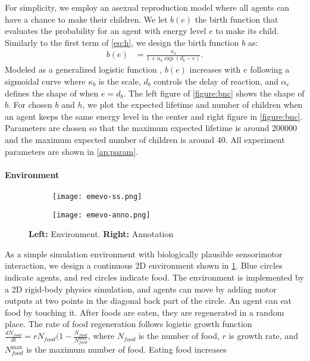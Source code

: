 For simplicity, we employ an asexual reproduction model where all agents can have a chance to make their children. We let $b(e)$ the birth function that evaluates the probability for an agent with energy level $e$ to make its child. Similarly to the first term of \cref{eq:h}, we design the birth function $b$ as:
\begin{align}
 b(e) &=  \frac{\kappa_{b}}{1 + \alpha_{b}\exp(d_{b} - e)}. \label{eq:b}
\end{align}
Modeled as a generalized logistic function \citep{richardsFlexibleGrowthFunction1959}, $b(e)$ increases with $e$ following a sigmoidal curve where $\kappa_{b}$ is the scale, $d_{b}$ controls the delay of reaction, and $\alpha_{e}$ defines the shape of when $e=d_{b}$. The left figure of \cref{figure:bnc} shows the shape of $b$. For chosen $b$ and $h$, we plot the expected lifetime and number of children when an agent keeps the same energy level in the center and right figure in \cref{figure:bnc}. Parameters are chosen so that the maximum expected lifetime is around \num{200000} and the maximum expected number of children is around 40. All experiment parameters are shown in \cref{ap:param}.

\paragraph{Environment}

\begin{figure}[t]
  \begin{subfigure}[t]{6cm}
    \centering
    \texttt{[image: emevo-ss.png]}
  \end{subfigure}
  \begin{subfigure}[t]{8cm}
    \centering
    \texttt{[image: emevo-anno.png]}
  \end{subfigure}
  \caption{
    \textbf{Left:} Environment.
    \textbf{Right:} Annotation
  }\label{figure:env}
\end{figure}

As a simple simulation environment with biologically plausible sensorimotor interaction, we design a continuous 2D environment shown in \cref{figure:env}. Blue circles indicate agents, and red circles indicate food. The environment is implemented by a 2D rigid-body physics simulation, and agents can move by adding motor outputs at two points in the diagonal back part of the circle. An agent can eat food by touching it. After foods are eaten, they are regenerated in a random place. The rate of food regeneration follows logistic growth function $\frac{dN_{food}}{dt} = r N_{food} (1 - \frac{N_{food}}{N_{food}^{\mathrm{max}}}$, where $N_{food}$ is the number of food, $r$ is growth rate, and $N_{food}^{\mathrm{max}}$ is the maximum number of food. Eating food increases

